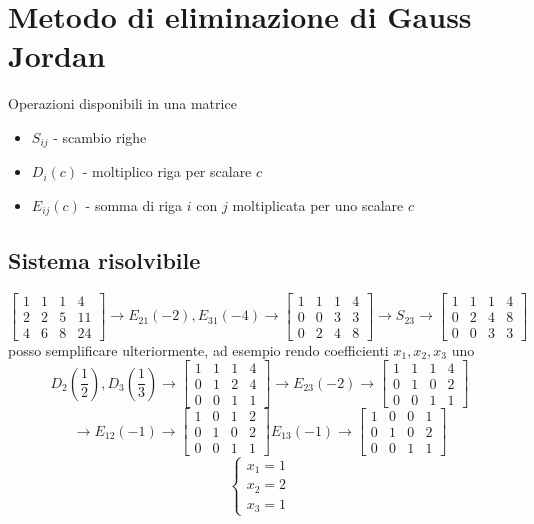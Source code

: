 \documentclass[12pt,a4paper,oneside]{article}
\begin{document}
\section{Metodo di eliminazione di Gauss Jordan}
Operazioni disponibili in una matrice
\begin{itemize}
	\item $S_{ij}$ - scambio righe
	\item $D_i\left( c \right) $ - moltiplico riga per scalare $ c $
	\item $E_{ij}\left( c \right) $ - somma di riga $ i$ con $j$ moltiplicata per uno scalare $ c $
\end{itemize}
\subsection{Sistema risolvibile}

\[
	\begin{bmatrix}
		1 & 1 & 1 & 4  \\
		2 & 2 & 5 & 11 \\
		4 & 6 & 8 & 24
	\end{bmatrix}
	\rightarrow
	E_{21}\left( -2 \right) , E_{31}\left( -4 \right)
	\rightarrow
	\begin{bmatrix}
		1 & 1 & 1 & 4 \\
		0 & 0 & 3 & 3 \\
		0 & 2 & 4 & 8
	\end{bmatrix}
	\rightarrow
	S_{23}
	\rightarrow
	\begin{bmatrix}
		1 & 1 & 1 & 4 \\
		0 & 2 & 4 & 8 \\
		0 & 0 & 3 & 3
	\end{bmatrix}
\]
posso semplificare ulteriormente, ad esempio rendo coefficienti $x_1, x_2, x_3$ uno
\[
	D_2\left( \frac{1}{2} \right) , D_3\left( \frac{1}{3} \right) \rightarrow
	\begin{bmatrix}
		1 & 1 & 1 & 4 \\
		0 & 1 & 2 & 4 \\
		0 & 0 & 1 & 1
	\end{bmatrix}
	\rightarrow
	E_{23}\left( -2 \right) \rightarrow
	\begin{bmatrix}
		1 & 1 & 1 & 4 \\
		0 & 1 & 0 & 2 \\
		0 & 0 & 1 & 1
	\end{bmatrix}
\]
\[
	\rightarrow
	E_{12}\left( -1 \right) \rightarrow
	\begin{bmatrix}
		1 & 0 & 1 & 2 \\
		0 & 1 & 0 & 2 \\
		0 & 0 & 1 & 1
	\end{bmatrix}
	E_{13}\left( -1 \right) \rightarrow
	\begin{bmatrix}
		1 & 0 & 0 & 1 \\
		0 & 1 & 0 & 2 \\
		0 & 0 & 1 & 1
	\end{bmatrix}
\]
\[
	\begin{cases}
		x_1=1 \\
		x_2=2 \\
		x_3=1
	\end{cases}
\]
\end{document}
